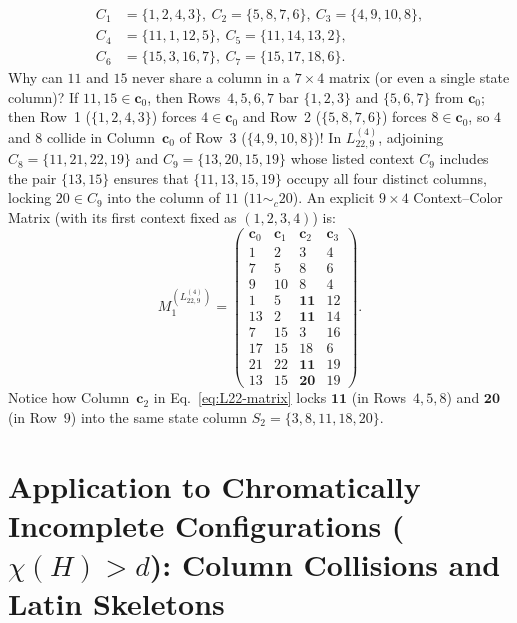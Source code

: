 \documentclass[aps,pra,reprint,superscriptaddress,longbibliography,nofootinbib,floatfix,10pt]{revtex4-2}
\theoremstyle{definition}\newtheorem{definition}[theorem]{Definition}
\theoremstyle{remark}\newtheorem{remark}[theorem]{Remark}
\begin{document}
\begin{itemize}
\[\begin{aligned}
C_1&=\{1,2,4,3\},\ C_2=\{5,8,7,6\},\ C_3=\{4,9,10,8\},\\
C_4&=\{11,1,12,5\},\ C_5=\{11,14,13,2\},\\
C_6&=\{15,3,16,7\},\ C_7=\{15,17,18,6\}.
\end{aligned}
\]
Why can $11$ and $15$ never share a column in a $7\times 4$ matrix (or even a single state column)? If $11,15\in\mathbf{c}_0$, then Rows~$4,5,6,7$ bar $\{1,2,3\}$ and $\{5,6,7\}$ from $\mathbf{c}_0$; then Row~1 ($\{1,2,4,3\}$) forces $4\in\mathbf{c}_0$ and Row~2 ($\{5,8,7,6\}$) forces $8\in\mathbf{c}_0$, so $4$ and $8$ collide in Column~$\mathbf{c}_0$ of Row~3 ($\{4,9,10,8\}$)! In $L_{22,9}^{(4)}$, adjoining $C_8=\{11,21,22,19\}$ and $C_9=\{13,20,15,19\}$ whose listed context $C_9$ includes the pair $\{13,15\}$ ensures that $\{11,13,15,19\}$ occupy all four distinct columns, locking $20\in C_9$ into the column of $11$ ($11\sim_c 20$). An explicit $9\times 4$ Context--Color Matrix (with its first context fixed as $(1,2,3,4)$) is:
\begin{equation}\label{eq:L22-matrix}
M_1^{(L_{22,9}^{(4)})}=\begin{pmatrix}
\mathbf{c}_0 & \mathbf{c}_1 & \mathbf{c}_2 & \mathbf{c}_3\\\hline
1 & 2 & 3 & 4\\
7 & 5 & 8 & 6\\
9 & 10 & 8 & 4\\
1 & 5 & \mathbf{11} & 12\\
13 & 2 & \mathbf{11} & 14\\
7 & 15 & 3 & 16\\
17 & 15 & 18 & 6\\
21 & 22 & \mathbf{11} & 19\\
13 & 15 & \mathbf{20} & 19
\end{pmatrix}.
\end{equation}
Notice how Column~$\mathbf{c}_2$ in Eq.~\eqref{eq:L22-matrix} locks $\mathbf{11}$ (in Rows~$4,5,8$) and $\mathbf{20}$ (in Row~$9$) into the same state column $S_2=\{3,8,11,18,20\}$.
\end{itemize}

\section{Application to Chromatically Incomplete Configurations (\texorpdfstring{$\chi(H)>d$}{chi(H)>d}): Column Collisions and Latin Skeletons}\label{sec:obstructions}
\end{document}
